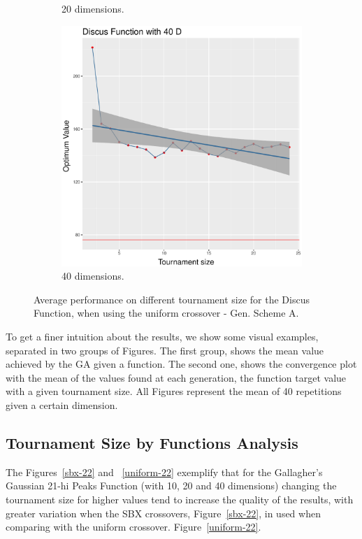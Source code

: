 \begin{figure}[t]
\begin{subfigure}[b]{0.33\textwidth}
		\caption{20 dimensions.}
	\end{subfigure}
	\begin{subfigure}[b]{0.33\textwidth}
		\centering
		\includegraphics[width=\textwidth]{img/unimodal_uniform_11_dim_40.pdf}
		\caption{40 dimensions.}
	\end{subfigure}
	\caption{Average performance on different tournament size for the Discus Function, when using the uniform crossover - Gen. Scheme A.}
	\label{uniform-11}
\end{figure}


To get a finer intuition about the results, we show  some visual examples, separated in two groups of Figures. The first group, shows the mean value achieved by the GA given a function. The second one, shows the convergence plot with the mean of the values found at each generation, the function target value with a given tournament size. All Figures represent the mean of 40 repetitions given a certain dimension.



\subsection{Tournament Size by Functions Analysis}
The Figures~\ref{sbx-22} and ~\ref{uniform-22} exemplify that for the Gallagher's Gaussian 21-hi Peaks Function (with 10, 20 and 40 dimensions) changing the tournament size for higher values tend to increase the quality of the results, with greater variation when the SBX crossovers, Figure~\ref{sbx-22}, in used when comparing with the uniform crossover. Figure~\ref{uniform-22}.

